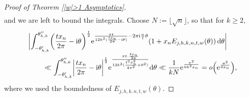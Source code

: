 \documentclass[pdftex]{sigma}
\numberwithin{equation}{section}
\begin{document}
\begin{proof}[Proof of Theorem \ref{|w|>1 Asymptotics}]
\begin{align}
 \end{align}
and we are left to bound the integrals. Choose $N:=\lfloor \sqrt{n} \rfloor$, so that for $k \geq 2$,{\samepage
\begin{align*}
 & \biggl|
 \int_{-\theta_{h,k}'}^{\theta_{h,k}''} \biggl(\frac{tx_n}{2\pi}-{\rm i}\theta\biggr)^{\frac{t}{2}}{\rm e}^{\frac{\pi t}{12k^2(\frac{tx_n}{2\pi}-{\rm i}\theta)}-2\pi {\rm i} \frac{n}{t} \theta} (1+x_n E_{j,h,k,n,t,w}(\theta)) \,{\rm d}\theta \biggr| \\[-1mm]
 &\qquad{} \ll \int_{-\theta_{h,k}'}^{\theta_{h,k}''} \biggl|\frac{tx_n}{2\pi}-{\rm i}\theta \biggr|^{\frac{t}{2}} {\rm e}^{\frac{\pi t \cdot \frac{tx_n}{2\pi}}{12k^2(\frac{t^2x_n^2}{4\pi^2}+\theta^2)}} {\rm d}\theta
 \ll \frac{1}{kN}{\rm e}^{\frac{\pi^2}{6k^2x_n}}
 =o\Bigl({\rm e}^{\frac{\pi^2}{6x_n}}\Bigr),
\end{align*}
where we used the boundedness of $E_{j,h,k,n,t,w}(\theta)$.}


\end{proof}
\end{document}
